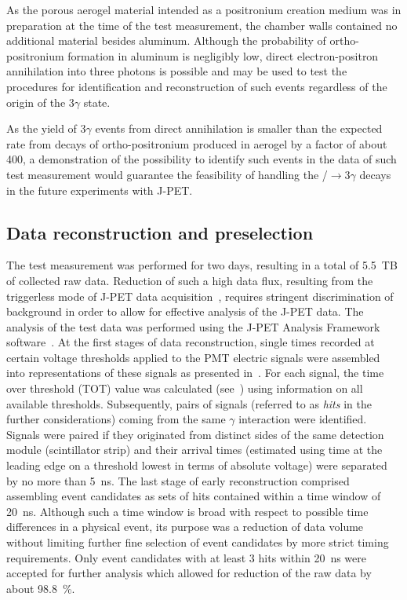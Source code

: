 As the porous aerogel material intended as a positronium creation medium was in preparation at the time of the test measurement, the chamber walls contained no additional material besides aluminum.
Although the probability of ortho-positronium formation in aluminum is negligibly low, direct electron-positron annihilation into three photons is possible and may be used to test the procedures for identification and reconstruction of such events regardless of the origin of the 3$\gamma$ state.

As the yield of 3$\gamma$ events from direct annihilation is smaller than the expected rate from decays of ortho-positronium produced in aerogel by a factor of about 400, a demonstration of the possibility to identify such events in the data of such test measurement would guarantee the feasibility of handling the \ops/$\to 3\gamma$ decays in the future experiments with J-PET\@.

\subsection{Data reconstruction and preselection}
\label{sec:jpet_preselection}
The test measurement was performed for two days, resulting in a total of 5.5~TB of collected raw data. Reduction of such a high data flux, resulting from the triggerless mode of J-PET data acquisition~\cite{greg_daq}, requires stringent discrimination of background in order to allow for effective analysis of the J-PET data. The analysis of the test data was performed using the J-PET Analysis Framework software~\cite{Krzemien:2015hkb}. At the first stages of data reconstruction, single times recorded at certain voltage thresholds applied to the PMT electric signals were assembled into representations of these signals as presented in~. For each signal, the time over threshold (TOT) value was calculated (see~) using information on all available thresholds. Subsequently, pairs of signals (referred to as \textit{hits} in the further considerations) coming from the same $\gamma$ interaction were identified. Signals were paired if they originated from distinct sides of the same detection module (scintillator strip) and their arrival times (estimated using time at the leading edge on a threshold lowest in terms of absolute voltage) were separated by no more than 5~ns. The last stage of early reconstruction comprised assembling event candidates as sets of hits contained within a time window of 20~ns. Although such a time window is broad with respect to possible time differences in a physical event, its purpose was a reduction of data volume without limiting further fine selection of event candidates by more strict timing requirements. Only event candidates with at least 3 hits within 20~ns were accepted for further analysis which allowed for reduction of the raw data by about \SI{98.8}{\percent}.

